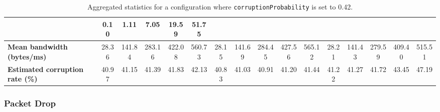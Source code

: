 \begin{table}[!h]
{\begin{tabular}{|l|ccccc|ccccc|ccccc|}
            & \multicolumn{1}{c|}{0.10}
            & \multicolumn{1}{c|}{1.11}
            & \multicolumn{1}{c|}{7.05}
            & \multicolumn{1}{c|}{19.59}
            & \multicolumn{1}{c|}{51.75}
            \\ \hline
            \textbf{Mean bandwidth (bytes/ms)} & \multicolumn{1}{c|}{28.36} & \multicolumn{1}{c|}{141.84}
            & \multicolumn{1}{c|}{283.16}
            & \multicolumn{1}{c|}{422.08}
            & \multicolumn{1}{c|}{560.73}
            & \multicolumn{1}{c|}{28.15}
            & \multicolumn{1}{c|}{141.69}
            & \multicolumn{1}{c|}{284.45}
            & \multicolumn{1}{c|}{427.56}
            & \multicolumn{1}{c|}{565.12}
            & \multicolumn{1}{c|}{28.21}
            & \multicolumn{1}{c|}{141.43}
            & \multicolumn{1}{c|}{279.59}
            & \multicolumn{1}{c|}{409.40}
            & \multicolumn{1}{c|}{515.51}
            \\ \hline
            \textbf{Estimated corruption rate (\%)} & \multicolumn{1}{c|}{40.97} & \multicolumn{1}{c|}{41.15}
            & \multicolumn{1}{c|}{41.39}
            & \multicolumn{1}{c|}{41.83}
            & \multicolumn{1}{c|}{42.13}
            & \multicolumn{1}{c|}{40.83}
            & \multicolumn{1}{c|}{41.03}
            & \multicolumn{1}{c|}{40.91}
            & \multicolumn{1}{c|}{41.20}
            & \multicolumn{1}{c|}{41.44}
            & \multicolumn{1}{c|}{41.22}
            & \multicolumn{1}{c|}{41.27}
            & \multicolumn{1}{c|}{41.72}
            & \multicolumn{1}{c|}{43.45}
            & \multicolumn{1}{c|}{47.19}
            \\ \hline
        \end{tabular}
    }
    \caption{Aggregated statistics for a configuration where \texttt{corruptionProbability} is set to 0.42.}
    \label{table:analysis_results_corruption}
\end{table}

\subsubsection{Packet Drop}\label{subsubsection:drop_analysis}

